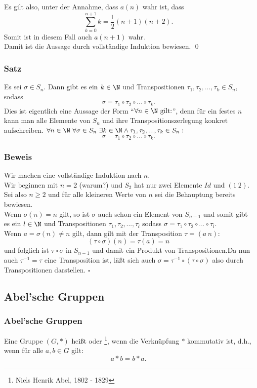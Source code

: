 %
%
\begin{frame}

Es gilt also, unter der Annahme, dass $a(n)$ wahr ist, dass 
	$$
		\sum_{k=0}^{n+1} k =  \frac{1}{2}(n+1)(n+2).
	$$
	Somit ist in diesem Fall auch $a(n+1)$ wahr.\\[5mm]

	
	Damit ist die Aussage durch vollständige Induktion bewiesen. \qed
	
\end{frame}
%

%
%
\begin{frame}\frametitle{Satz}
	
Es sei $\sigma \in S_n$. Dann gibt es ein $k \in \N$ und Transpositionen $\tau_1,\tau_2,...,\tau_k \in S_n$, sodass
$$ \sigma=\tau_1 \circ \tau_2 \circ ... \circ \tau_k. $$
\vfill \pause
Dies ist eigentlich eine Aussage der Form ``$\forall n \in \N \text{ gilt:}$'', denn für ein festes $n$ kann man alle Elemente von $S_n$ und ihre Transpositionszerlegung konkret aufschreiben.\pause
\vfill 
$\forall n \in \N \ \forall \sigma \in S_n \ \exists k \in \N \land \tau_1,\tau_2,...,\tau_k \in S_n:$
$$ \sigma=\tau_1 \circ \tau_2 \circ ... \circ \tau_k. $$
\end{frame}
%
%
\begin{frame}\frametitle{Beweis}
Wir machen eine vollständige Induktion nach $n$.\\\pause
Wir beginnen mit $n=2$ (warum?) und $S_2$ hat nur zwei Elemente $Id$ und $(1\ 2)$.	\\\pause
Sei also $n\ge 2$ und für alle kleineren Werte von $n$ sei die Behauptung bereits bewiesen.\\ \pause
Wenn $\sigma(n)=n$ gilt, so ist $\sigma$ auch schon ein Element von $S_{n-1}$ und somit gibt es ein $l \in \N$ und  Transpositionen $\tau_1,\tau_2,...,\tau_l$ sodass $\sigma=\tau_1 \circ \tau_2 \circ ... \circ \tau_l$.\pause\\
Wenn $a=\sigma(n) \ne n$ gilt, dann gilt mit der Transposition $\tau=(a\ n)$:
$$(\tau \circ \sigma)(n)=\tau(a)=n$$
und folglich ist $\tau \circ \sigma$ in $S_{n-1}$ und damit ein Produkt von Transpositionen.\pause Da nun auch $\tau^{-1} = \tau$ eine Transposition ist, läßt sich auch $\sigma=\tau^{-1} \circ (\tau \circ \sigma)$ also durch Transpositionen darstellen. \hfill $\square$

	
\end{frame}
%
%


%
\subsection{Abel'sche Gruppen}
%
%
\begin{frame}\frametitle{Abel'sche Gruppen}

	Eine Gruppe $(G,\ast)$ hei{\ss}t  oder \footnote{Niels Henrik Abel, 1802 - 1829},
	wenn die Verknüpfung $\ast$ kommutativ ist, d.h., wenn für alle $a,b \in G$ gilt:
	$$
		a\ast b = b \ast a.
	$$

\end{frame}
%

